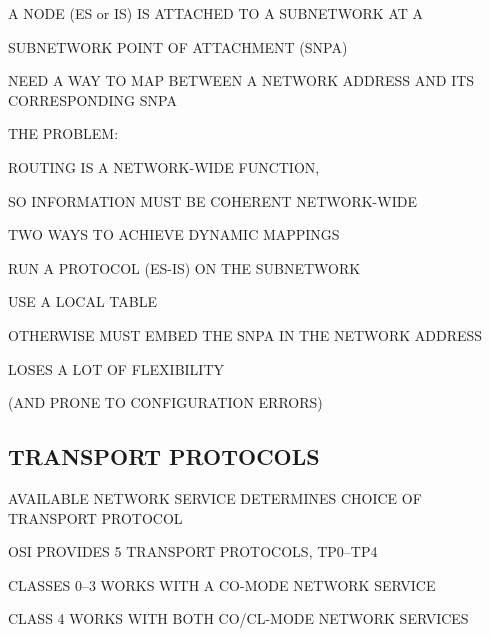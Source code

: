 \begin{bwslide}

\begin{nrtc}
\item	A NODE (ES or IS) IS ATTACHED TO A SUBNETWORK AT A
    \begin{nrtc}
    \item	SUBNETWORK POINT OF ATTACHMENT (SNPA)
    \end{nrtc}

\item	NEED A WAY TO MAP BETWEEN A NETWORK ADDRESS
	AND ITS CORRESPONDING SNPA

\item	THE PROBLEM:
    \begin{nrtc}
    \item	ROUTING IS A NETWORK-WIDE FUNCTION,

    \item	SO INFORMATION MUST BE COHERENT NETWORK-WIDE
    \end{nrtc}
\end{nrtc}
\end{bwslide}


\begin{bwslide}

\begin{nrtc}
\item	TWO WAYS TO ACHIEVE DYNAMIC MAPPINGS

\item	RUN A PROTOCOL (ES-IS) ON THE SUBNETWORK

\item	USE A LOCAL TABLE

\item	OTHERWISE MUST EMBED THE SNPA IN THE NETWORK ADDRESS
    \begin{nrtc}
    \item	LOSES A LOT OF FLEXIBILITY
    \end{nrtc}
	(AND PRONE TO CONFIGURATION ERRORS)
\end{nrtc}
\end{bwslide}


\begin{bwslide}
\part*	{TRANSPORT PROTOCOLS}\bf

\begin{nrtc}
\item	AVAILABLE NETWORK SERVICE DETERMINES CHOICE OF TRANSPORT PROTOCOL

\item	OSI PROVIDES 5 TRANSPORT PROTOCOLS, TP0--TP4
    \begin{nrtc}
    \item	CLASSES 0--3 WORKS WITH A CO-MODE NETWORK SERVICE

    \item	CLASS 4 WORKS WITH BOTH CO/CL-MODE NETWORK SERVICES
    \end{nrtc}
\end{nrtc}
\end{bwslide}


